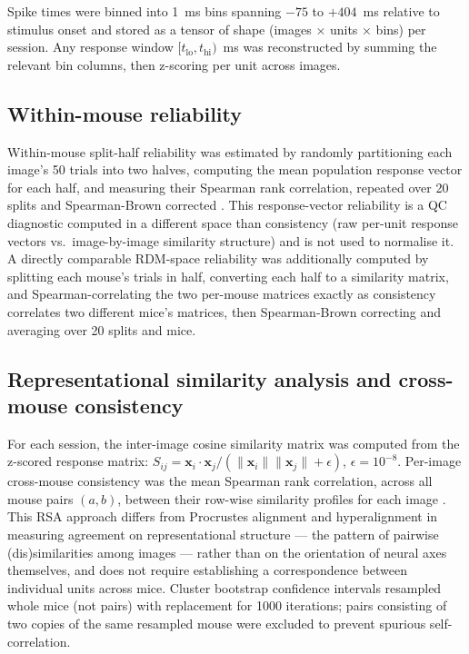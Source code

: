\documentclass[11pt,onecolumn]{article}
\begin{document}
Spike times were binned into 1~ms bins spanning $-75$ to $+404$~ms
relative to stimulus onset and stored as a tensor of shape (images
$\times$ units $\times$ bins) per session. Any response window
$[t_\mathrm{lo}, t_\mathrm{hi})$~ms was reconstructed by summing the
relevant bin columns, then z-scoring per unit across images.

\subsection{Within-mouse reliability}
\label{Methods:Within-mouse reliability}

Within-mouse split-half reliability was estimated by randomly
partitioning each image's 50 trials into two halves, computing the mean
population response vector for each half, and measuring their Spearman
rank correlation, repeated over 20 splits and Spearman-Brown corrected
\citep{spearman1910,brown1910}. This response-vector reliability is a QC
diagnostic computed in a different space than consistency (raw per-unit
response vectors vs.\ image-by-image similarity structure) and is not
used to normalise it. A directly comparable RDM-space reliability 
was additionally computed by splitting each mouse's
trials in half, converting each half to a similarity matrix, and
Spearman-correlating the two per-mouse matrices exactly as consistency
correlates two different mice's matrices, then Spearman-Brown correcting
and averaging over 20 splits and mice.

\subsection{Representational similarity analysis and cross-mouse
consistency}
\label{Methods:RSA}

For each session, the inter-image cosine similarity matrix was computed
from the z-scored response matrix:
$S_{ij} = \mathbf{x}_i \cdot \mathbf{x}_j /
(\|\mathbf{x}_i\| \|\mathbf{x}_j\| + \epsilon)$, $\epsilon = 10^{-8}$.
Per-image cross-mouse consistency was the mean Spearman rank correlation,
across all mouse pairs $(a,b)$, between their row-wise similarity profiles
for each image \citep{kriegeskorte2008}. This RSA approach differs from
Procrustes alignment and hyperalignment \citep{williams2021, haxby2011} in
measuring agreement on representational structure --- the pattern of
pairwise (dis)similarities among images --- rather than on the orientation
of neural axes themselves, and does not require establishing a
correspondence between individual units across mice. Cluster bootstrap confidence
intervals resampled whole mice (not pairs) with replacement for 1000
iterations; pairs consisting of two copies of the same resampled mouse
were excluded to prevent spurious self-correlation.
\end{document}

